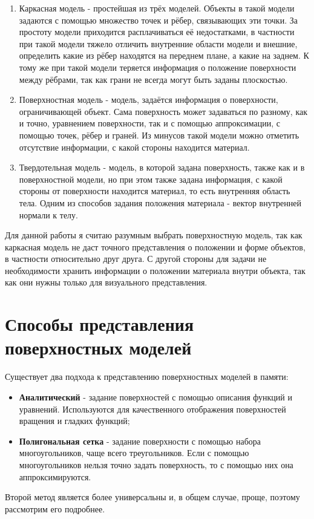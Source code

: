 \begin{enumerate}
	\item Каркасная модель - простейшая из трёх моделей. Объекты в такой модели задаются с помощью множество точек и рёбер, связывающих эти точки. За простоту модели приходится расплачиваться её недостатками, в частности при такой модели тяжело отличить внутренние области модели и внешние, определить какие из рёбер находятся на переднем плане, а какие на заднем. К тому же при такой модели теряется информация о положение поверхности между рёбрами, так как грани не всегда могут быть заданы плоскостью.
	\item Поверхностная модель - модель, задаётся информация о поверхности, ограничивающей объект. Сама поверхность может задаваться по разному, как и точно, уравнением поверхности, так и с помощью аппроксимации, с помощью точек, рёбер и граней. Из минусов такой модели можно отметить отсутствие информации, с какой стороны находится материал.
	\item Твердотельная модель - модель, в которой задана поверхность, также как и в поверхностной модели, но при этом также задана информация, с какой стороны от поверхности находится материал, то есть внутренняя область тела. Одним из способов задания положения материала - вектор внутренней нормали к телу.
\end{enumerate}

Для данной работы я считаю разумным выбрать поверхностную модель, так как каркасная модель не даст точного представления о положении и форме объектов, в частности относительно друг друга. С другой стороны для задачи не необходимости хранить информации о положении материала внутри объекта, так как они нужны только для визуального представления.

\section{Способы представления поверхностных моделей}
Существует два подхода к представлению поверхностных моделей в памяти:
\begin{itemize}
	\item \textbf{Аналитический} - задание поверхностей с помощью описания функций и уравнений. Используются для качественного отображения поверхностей вращения и гладких функций;
	\item \textbf{Полигональная сетка} - задание поверхности с помощью набора многоугольников, чаще всего треугольников. Если с помощью многоугольников нельзя точно задать поверхность, то с помощью них она аппроксимируются.
\end{itemize}
Второй метод является более универсальны и, в общем случае, проще, поэтому рассмотрим его подробнее.

